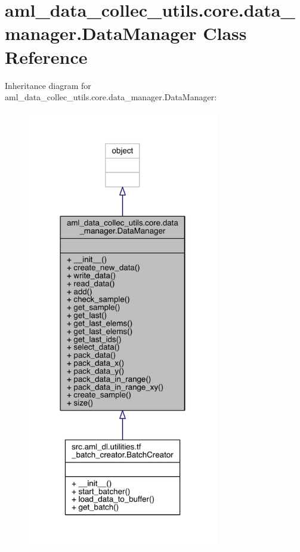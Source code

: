 \hypertarget{classaml__data__collec__utils_1_1core_1_1data__manager_1_1_data_manager}{}\section{aml\+\_\+data\+\_\+collec\+\_\+utils.\+core.\+data\+\_\+manager.\+Data\+Manager Class Reference}
\label{classaml__data__collec__utils_1_1core_1_1data__manager_1_1_data_manager}


Inheritance diagram for aml\+\_\+data\+\_\+collec\+\_\+utils.\+core.\+data\+\_\+manager.\+Data\+Manager\+:
\nopagebreak
\begin{figure}[H]
\begin{center}
\leavevmode
\includegraphics[width=236pt]{classaml__data__collec__utils_1_1core_1_1data__manager_1_1_data_manager__inherit__graph}
\end{center}
\end{figure}


